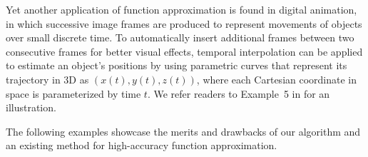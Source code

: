 \documentclass[review]{elsarticle}
\newcommand{\abstol}{\varepsilon}
\theoremstyle{definition}
\newcommand{\cosappx}{\widehat{\operatorname*{cos}}}
\newcommand{\sinappx}{\widehat{\operatorname*{sin}}}
\begin{document}
\begin{comment}
Denote $\sinappx(x)$ and $\cosappx (x)$ the approximate functions of $\sin(x)$ and
$\cos(x)$ on the interval $[0,4\pi]$, respectively; and let the resultant
approximants of $x(u,v)$, $y(u,v)$, and $z(u,v)$ be $\hat{x}(u,v)$,
$\hat{y}(u,v)$, and $\hat{z}(u,v)$, respectively.
Then we have
\begin{align*}
   \hat{x}(u,v) & =  \left[a\left(1-\frac{v}{2\pi}\right)\left(1+\cosappx(u)\right) + c\right]\cosappx(nv),
\\ \hat{y}(u,v) & = \left[a\left(1-\frac{v}{2\pi}\right)(1+\cosappx(u)) + c\right] \sinappx(nv),
\\ \hat{z}(u,v) & = \frac{bv}{2\pi} + a\left(1-\frac{v}{2\pi}\right)\sinappx(u).
\end{align*}
Define the \emph{overall} approximation error measure as the supremum norm
\begin{align*}
   \max\limits_{u,v \in [0, 2 \pi] } & \left\{   |x(u,v)-\hat{x}(u,v)|,\right.
   \left.  |y(u,v)-\hat{y}(u,v)|,
                                  \ \    |z(u,v)-\hat{z}(u,v)|\right\}.
\end{align*}
Even if we set the error tolerance $\abstol$ to be as big as $0.1$ for computing
$\sinappx$ and $\cosappx$, we can still obtain a much diminished overall error
in the order of $9 \times 10^{-4}$; see the error plot in
Figure~\ref{fig:funappxseashell}b). The reconstructed surface in
Figure~\ref{fig:funappxseashell}a) is very similar to the original seashell
image.
\end{exmp}
\end{comment}

Yet another application of function approximation is found in digital animation,
in which successive image frames are produced to represent movements of
objects over small discrete time. To automatically insert additional frames between
two consecutive frames for better visual effects, temporal
interpolation can be applied to estimate an object's positions by using
parametric curves that represent its trajectory in 3D as $(x(t), y(t), z(t))$,
where each Cartesian coordinate in space is parameterized by time $t$. We refer
readers to Example~5 in \cite[Chapter~3, Section~6]{Din15a} for an illustration.


The following examples showcase the merits and drawbacks of our algorithm and an
existing method for high-accuracy function approximation.
\end{document}
